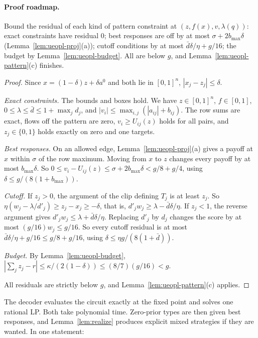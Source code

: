 \paragraph{Proof roadmap.} Bound the residual of each kind of pattern constraint at
$(z,f(x),v,\lambda(q))$: exact constraints have residual $0$; best responses are off by at most
$\sigma+2b_{\max}\delta$ (Lemma~\ref{lem:ueopl-proj}(a)); cutoff conditions by at most
$\bar d\delta/\eta+g/16$; the budget by Lemma~\ref{lem:ueopl-budget}. All are below $g$, and
Lemma~\ref{lem:ueopl-pattern}(c) finishes.

\begin{proof}
Since $x=(1-\delta)z+\delta a^0$ and both lie in $[0,1]^n$, $|x_j-z_j|\le\delta$.

\emph{Exact constraints.} The bounds and boxes hold. We have $z\in[0,1]^n$, $f\in[0,1]$,
$0\le\lambda\le\bar d\le1+\max_jd_j$, and $|v_i|\le\max_{i,j}(|a_{ij}|+b_{ij})$. The row sums are exact,
flows off the pattern are zero, $v_i\ge U_{ij}(z)$ holds for all pairs, and $z_j\in\{0,1\}$ holds exactly
on zero and one targets.

\emph{Best responses.} On an allowed edge, Lemma~\ref{lem:ueopl-proj}(a) gives a payoff at $x$ within
$\sigma$ of the row maximum. Moving from $x$ to $z$ changes every payoff by at most $b_{\max}\delta$. So
$0\le v_i-U_{ij}(z)\le\sigma+2b_{\max}\delta<g/8+g/4$, using $\delta\le g/(8(1+b_{\max}))$.

\emph{Cutoff.} If $z_j>0$, the argument of the clip defining $T_j$ is at least $z_j$. So
$\eta(w_j-\lambda/d'_j)\ge z_j-x_j\ge-\delta$, that is, $d'_jw_j\ge\lambda-\bar d\delta/\eta$. If
$z_j<1$, the reverse argument gives $d'_jw_j\le\lambda+\bar d\delta/\eta$. Replacing $d'_j$ by $d_j$
changes the score by at most $(g/16)w_j\le g/16$. So every cutoff residual is at most
$\bar d\delta/\eta+g/16\le g/8+g/16$, using $\delta\le\eta g/(8(1+\bar d))$.

\emph{Budget.} By Lemma~\ref{lem:ueopl-budget}, $|\sum_jz_j-r|\le\kappa/(2(1-\delta))\le(8/7)(g/16)<g$.

All residuals are strictly below $g$, and Lemma~\ref{lem:ueopl-pattern}(c) applies.
\end{proof}

The decoder evaluates the circuit exactly at the fixed point and solves one rational LP. Both take
polynomial time. Zero-prior types are then given best responses, and Lemma~\ref{lem:realize} produces
explicit mixed strategies if they are wanted. In one statement:

